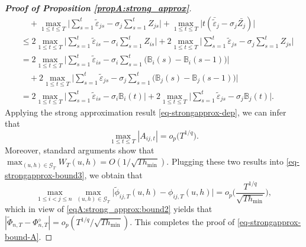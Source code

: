 \begin{proof}[\textnormal{\textbf{Proof of Proposition \ref{propA:strong_approx}}}]
\begin{align*}
 & \quad + \max_{1 \le t \le T} \Big| \sum\limits_{s=1}^t \widetilde{\varepsilon}_{js} - {\sigma}_j \sum\limits_{s=1}^t Z_{js} \Big| + \max_{1 \le t \le T} \Big| t (\bar{\widetilde{\varepsilon}}_{j} -{\sigma}_j \bar{Z_j}) \Big| \\
 & \le 2 \max_{1 \le t \le T} \Big| \sum\limits_{s=1}^t \widetilde{\varepsilon}_{is} -{\sigma}_i \sum\limits_{s=1}^t Z_{is} \Big| + 2 \max_{1 \le t \le T} \Big| \sum\limits_{s=1}^t \widetilde{\varepsilon}_{js} -{\sigma}_j \sum\limits_{s=1}^t Z_{js} \Big| \\
 & = 2 \max_{1 \le t \le T} \Big| \sum\limits_{s=1}^t \widetilde{\varepsilon}_{is} - {\sigma}_i \sum\limits_{s=1}^t \big(\mathbb{B}_{i}(s) - \mathbb{B}_{i}(s-1) \big) \Big| \\
 & \quad +  2 \max_{1 \le t \le T} \Big| \sum\limits_{s=1}^t \widetilde{\varepsilon}_{js} -{\sigma}_j \sum\limits_{s=1}^t \big(\mathbb{B}_{j}(s) - \mathbb{B}_{j}(s-1) \big) \Big|\\
 & = 2 \max_{1 \le t \le T} \Big| \sum\limits_{s=1}^t \widetilde{\varepsilon}_{is} - {\sigma}_i \mathbb{B}_{i}(t) \Big| + 2 \max_{1 \le t \le T} \Big| \sum\limits_{s=1}^t \widetilde{\varepsilon}_{js} - {\sigma}_j \mathbb{B}_{j}(t) \Big|.
\end{align*}
Applying the strong approximation result \eqref{eq-strongapprox-dep}, we can infer that
\[ \max_{1 \le t \le T} |A_{ij, t}| = o_p\big(T^{1/q}\big). \]
Moreover, standard arguments show that $\max_{(u,h) \in \mathcal{G}_T} W_T(u,h) = O( 1/\sqrt{Th_{\min}} )$. Plugging these two results into \eqref{eq-strongapprox-bound3}, we obtain that 
\[ \max_{1\le i < j \le n} \max_{(u,h) \in \mathcal{G}_T} \big| \widetilde{\phi}_{ij, T}(u,h) - \phi_{ij, T}(u,h) \big| = o_p \Big( \frac{T^{1/q}}{\sqrt{Th_{\min}}} \Big), \]
which in view of \eqref{eqA:strong_approx:bound2} yields that $| \widetilde{\Phi}_{n, T} - \Phi_{n, T}^{\diamond} | = o_p( T^{1/q}/\sqrt{Th_{\min}})$. This completes the proof of \eqref{eq-strongapprox-bound-A}.



\end{proof}
